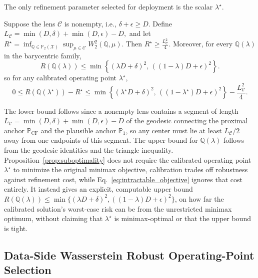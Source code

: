 The only refinement parameter selected for deployment is the scalar $\lambda^\star$.
\fi
\begin{proposition}
\label{prop:suboptimality}
Suppose the lens $\mathcal C$ is nonempty, i.e.,
$\delta+\epsilon\ge D$.
Define
$
L_{\mathcal C}
=
\min(D,\delta)+\min(D,\epsilon)-D,
$
and let
$
R^\star
=
\inf_{\mathbb Q\in\mathbb P_2(\mathcal X)}
\sup_{\mu\in\mathcal C}
W_2^2(\mathbb Q,\mu).
$
Then
$
R^\star
\ge
\frac{L_{\mathcal C}^2}{4}.
$
Moreover, for every $\mathbb Q(\lambda)$ in the barycentric
family,
\[
R(\mathbb Q(\lambda))
\le
\min\left\{
(\lambda D+\delta)^2,\,
((1-\lambda)D+\epsilon)^2
\right\}.
\]
so for any calibrated operating point $\lambda^\star$,
\[
0
\le
R(\mathbb Q(\lambda^\star))-R^\star
\le
\min\left\{
(\lambda^\star D+\delta)^2,\,
((1-\lambda^\star)D+\epsilon)^2
\right\}
-
\frac{L_{\mathcal C}^2}{4}.
\]
\end{proposition}

The lower bound follows since a nonempty lens contains a segment of length $L_{\mathcal C}=\min(D,\delta)+\min(D,\epsilon)-D$ of the geodesic connecting the proximal anchor
$\mathbb{P}_{\mathrm{CF}}$ and the plausible anchor $\mathbb{P}_1$, so any center must lie at least $L_{\mathcal C}/2$ away from one endpoints of this segment. The upper bound for $\mathbb Q(\lambda)$ follows from the geodesic identities and the triangle inequality. 
Proposition~\ref{prop:suboptimality} does not require the calibrated operating point $\lambda^\star$ to minimize the original minimax objective, calibration trades off robustness against refinement cost, while Eq.~\ref{eq:intractable_objective} ignores that cost entirely.
It instead gives an explicit, computable upper
bound
$R(\mathbb Q(\lambda))
\le
\min\{(\lambda D+\delta)^2,
((1-\lambda)D+\epsilon)^2\}$, on how far the calibrated solution's worst-case risk can be from the unrestricted minimax optimum, without claiming that $\lambda^\star$ is minimax-optimal or that the upper bound is tight.
\fi

\subsection{Data-Side Wasserstein Robust Operating-Point Selection}

